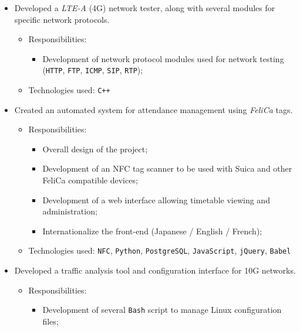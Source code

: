 \documentclass[11pt,a4paper,sans]{moderncv}        %
\begin{document}
{\begin{itemize}
\begin{itemize}
        \item Technologies used: \texttt{Go}, \texttt{Perl}, \texttt{XSLT}, \texttt{Bash}, \texttt{PostgreSQL}
\end{itemize}
\item Developed a \emph{LTE-A} (4G) network tester, along with several modules for specific network protocols.
    \begin{itemize}%
        \item Responsibilities:
            \begin{itemize}%
                \item Development of network protocol modules used for network testing (\texttt{HTTP}, \texttt{FTP}, \texttt{ICMP}, \texttt{SIP}, \texttt{RTP});
            \end{itemize}
        \item Technologies used: \texttt{C++}
    \end{itemize}
\item Created an automated system for attendance management using \emph{FeliCa} tags.
    \begin{itemize}%
        \item Responsibilities:
            \begin{itemize}%
                \item Overall design of the project;
                \item Development of an NFC tag scanner to be used with Suica and other FeliCa compatible devices;
                \item Development of a web interface allowing timetable viewing and administration;
                \item Internationalize the front-end (Japanese / English / French);
            \end{itemize}
        \item Technologies used: \texttt{NFC}, \texttt{Python}, \texttt{PostgreSQL}, \texttt{JavaScript}, \texttt{jQuery}, \texttt{Babel}
    \end{itemize}
\item Developed a traffic analysis tool and configuration interface for 10G networks.
    \begin{itemize}%
        \item Responsibilities:
            \begin{itemize}%
                \item Development of several \texttt{Bash} script to manage Linux configuration files;

\end{itemize}
\end{itemize}
\end{itemize}}
\end{document}
